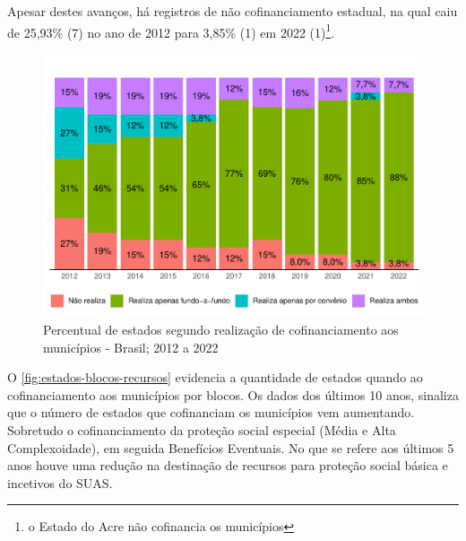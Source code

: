 \documentclass[
  brazilian]{report}
\begin{document}
Apesar destes avanços, há registros de não cofinanciamento estadual, na
qual caiu de 25,93\% (7) no ano de 2012 para 3,85\% (1) em 2022
(1)\footnote{o Estado do Acre não cofinancia os municípios}.

\begin{figure}
\includegraphics{Censo-SUAS-2022_files/figure-latex/estados-cofinanciamento-municipios-1} \caption[Percentual de estados segundo realização de cofinanciamento aos municípios - Brasil]{Percentual de estados segundo realização de cofinanciamento aos municípios - Brasil; 2012 a 2022}\label{fig:estados-cofinanciamento-municipios}
\end{figure}

O \cref{fig:estados-blocos-recursos} evidencia a quantidade de estados
quando ao cofinanciamento aos municípios por blocos. Os dados dos
últimos 10 anos, sinaliza que o número de estados que cofinanciam os
municípios vem aumentando. Sobretudo o cofinanciamento da proteção
social especial (Média e Alta Complexoidade), em seguida Benefícios
Eventuais. No que se refere aos últimos 5 anos houve uma redução na
destinação de recursos para proteção social básica e incetivos do SUAS.
\end{document}
